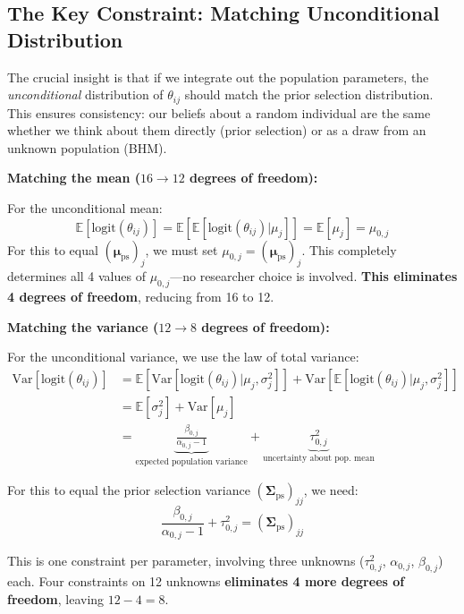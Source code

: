 \documentclass[11pt]{article}
\newcommand{\E}{\mathbb{E}}
\newcommand{\Var}{\text{Var}}
\begin{document}
\subsection{The Key Constraint: Matching Unconditional Distribution}

The crucial insight is that if we integrate out the population parameters, the \textit{unconditional} distribution of $\theta_{ij}$ should match the prior selection distribution. This ensures consistency: our beliefs about a random individual are the same whether we think about them directly (prior selection) or as a draw from an unknown population (BHM).

\textbf{Matching the mean ($16 \to 12$ degrees of freedom):}

For the unconditional mean:
\[
  \E[\text{logit}(\theta_{ij})] = \E[\E[\text{logit}(\theta_{ij}) | \mu_j]] = \E[\mu_j] = \mu_{0,j}
\]
For this to equal $(\boldsymbol{\mu}_{\text{ps}})_j$, we must set $\mu_{0,j} = (\boldsymbol{\mu}_{\text{ps}})_j$. This completely determines all 4 values of $\mu_{0,j}$---no researcher choice is involved. \textbf{This eliminates 4 degrees of freedom}, reducing from 16 to 12.

\textbf{Matching the variance ($12 \to 8$ degrees of freedom):}

For the unconditional variance, we use the law of total variance:
\begin{align}
  \Var[\text{logit}(\theta_{ij})] &= \E[\Var[\text{logit}(\theta_{ij}) | \mu_j, \sigma_j^2]] + \Var[\E[\text{logit}(\theta_{ij}) | \mu_j, \sigma_j^2]] \nonumber \\
  &= \E[\sigma_j^2] + \Var[\mu_j] \nonumber \\
  &= \underbrace{\frac{\beta_{0,j}}{\alpha_{0,j} - 1}}_{\text{expected population variance}} + \underbrace{\tau_{0,j}^2}_{\text{uncertainty about pop.\ mean}}
  \label{eq:total_variance}
\end{align}

For this to equal the prior selection variance $(\boldsymbol{\Sigma}_{\text{ps}})_{jj}$, we need:
\begin{equation}
  \frac{\beta_{0,j}}{\alpha_{0,j} - 1} + \tau_{0,j}^2 = (\boldsymbol{\Sigma}_{\text{ps}})_{jj}
  \label{eq:variance_constraint}
\end{equation}

This is one constraint per parameter, involving three unknowns ($\tau_{0,j}^2$, $\alpha_{0,j}$, $\beta_{0,j}$) each. Four constraints on 12 unknowns \textbf{eliminates 4 more degrees of freedom}, leaving $12 - 4 = 8$.
\end{document}
